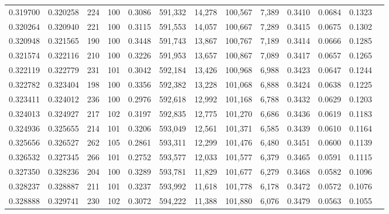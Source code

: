 \begin{tabular}{rrrrrrrrrrrrr}
0.319700 & 0.320258 &   224 & 100 &                                     0.3086 & 591,332 &  14,278 & 100,567 &   7,389 & 0.3410 & 0.0684 & 0.1323 \\
0.320264 & 0.320940 &   221 & 100 &                                     0.3115 & 591,553 &  14,057 & 100,667 &   7,289 & 0.3415 & 0.0675 & 0.1302 \\
0.320948 & 0.321565 &   190 & 100 &                                     0.3448 & 591,743 &  13,867 & 100,767 &   7,189 & 0.3414 & 0.0666 & 0.1285 \\
0.321574 & 0.322116 &   210 & 100 &                                     0.3226 & 591,953 &  13,657 & 100,867 &   7,089 & 0.3417 & 0.0657 & 0.1265 \\
0.322119 & 0.322779 &   231 & 101 &                                     0.3042 & 592,184 &  13,426 & 100,968 &   6,988 & 0.3423 & 0.0647 & 0.1244 \\
0.322782 & 0.323404 &   198 & 100 &                                     0.3356 & 592,382 &  13,228 & 101,068 &   6,888 & 0.3424 & 0.0638 & 0.1225 \\
0.323411 & 0.324012 &   236 & 100 &                                     0.2976 & 592,618 &  12,992 & 101,168 &   6,788 & 0.3432 & 0.0629 & 0.1203 \\
0.324013 & 0.324927 &   217 & 102 &                                     0.3197 & 592,835 &  12,775 & 101,270 &   6,686 & 0.3436 & 0.0619 & 0.1183 \\
0.324936 & 0.325655 &   214 & 101 &                                     0.3206 & 593,049 &  12,561 & 101,371 &   6,585 & 0.3439 & 0.0610 & 0.1164 \\
0.325656 & 0.326527 &   262 & 105 &                                     0.2861 & 593,311 &  12,299 & 101,476 &   6,480 & 0.3451 & 0.0600 & 0.1139 \\
0.326532 & 0.327345 &   266 & 101 &                                     0.2752 & 593,577 &  12,033 & 101,577 &   6,379 & 0.3465 & 0.0591 & 0.1115 \\
0.327350 & 0.328236 &   204 & 100 &                                     0.3289 & 593,781 &  11,829 & 101,677 &   6,279 & 0.3468 & 0.0582 & 0.1096 \\
0.328237 & 0.328887 &   211 & 101 &                                     0.3237 & 593,992 &  11,618 & 101,778 &   6,178 & 0.3472 & 0.0572 & 0.1076 \\
0.328888 & 0.329741 &   230 & 102 &                                     0.3072 & 594,222 &  11,388 & 101,880 &   6,076 & 0.3479 & 0.0563 & 0.1055 \\

\end{tabular}
